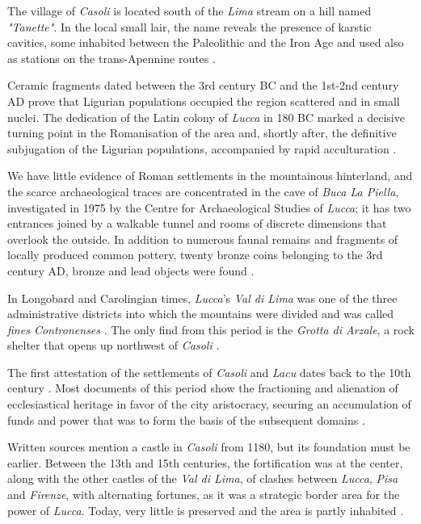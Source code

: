 \documentclass[sustainability,article,submit,pdftex,moreauthors]{Definitions/mdpi}
\begin{document}
The village of \emph{Casoli} is located south of the \emph{Lima} stream on a hill named {\em "Tanette"}. In the local small lair, the name reveals the presence of karstic cavities, some inhabited between the Paleolithic and the Iron Age and used also as stations on the trans-Apennine routes \cite{men76, gia96, pal63, zec72a, zec72b}.

Ceramic fragments dated between the 3rd century BC and the 1st-2nd century AD prove that Ligurian populations occupied the region scattered and in small nuclei. The dedication of the Latin colony of \textit{Lucca} in 180 BC marked a decisive turning point in the Romanisation of the area and, shortly after, the definitive subjugation of the Ligurian populations, accompanied by rapid acculturation \cite{gia96, cia05}.

We have little evidence of Roman settlements in the mountainous hinterland, and the scarce archaeological traces are concentrated in the cave of \textit{Buca La Piella}, investigated in 1975 by the Centre for Archaeological Studies of \emph{Lucca}; it has two entrances joined by a walkable tunnel and rooms of discrete dimensions that overlook the outside. In addition to numerous faunal remains and fragments of locally produced common pottery, twenty bronze coins belonging to the 3rd century AD, bronze and lead objects were found \cite{gia96, men81, cia03}. 

In Longobard and Carolingian times, \emph{Lucca}'s \emph{Val di Lima} was one of the three administrative districts into which the mountains were divided and was called \emph{fines Contronenses} \cite{qui02, cia06, cia11}. The only find from this period is the \textit{Grotta di Arzale}, a rock shelter that opens up northwest of \emph{Casoli} \cite{gia96}.

The first attestation of the settlements of \emph{Casoli} and \emph{Lacu} dates back to the 10th century \cite{gia96}. Most documents of this period show the fractioning and alienation of ecclesiastical heritage in favor of the city aristocracy, securing an accumulation of funds and power that was to form the basis of the subsequent domains \cite{qui02, gia96, for12, for15}.

Written sources mention a castle in \emph{Casoli} from 1180, but its foundation must be earlier. Between the 13th and 15th centuries, the fortification was at the center, along with the other castles of the \emph{Val di Lima}, of clashes between \emph{Lucca}, \textit{Pisa} and \emph{Firenze}, with alternating fortunes, as it was a strategic border area for the power of \emph{Lucca}. Today, very little is preserved and the area is partly inhabited \cite{gia96, for12, rom16}.
\end{document}
